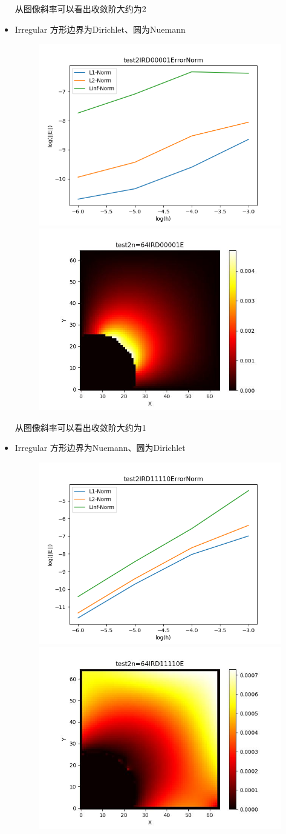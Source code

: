 \documentclass{article}
\begin{document}
\begin{itemize}
    从图像斜率可以看出收敛阶大约为2
    \item Irregular 方形边界为Dirichlet、圆为Nuemann
    \begin{figure}[h]
        \centering
        \includegraphics[width=0.35\linewidth]{test2IRD00001ErrorNormjpg.png}
        \includegraphics[width=0.35\linewidth]{test2n=64IRD00001E.jpg}
    \end{figure}

    从图像斜率可以看出收敛阶大约为1
    \newpage
    \item Irregular 方形边界为Nuemann、圆为Dirichlet
    \begin{figure}[h]
        \centering
        \includegraphics[width=0.35\linewidth]{test2IRD11110ErrorNormjpg.png}
        \includegraphics[width=0.35\linewidth]{test2n=64IRD11110E.jpg}
    \end{figure}


\end{itemize}
\end{document}
